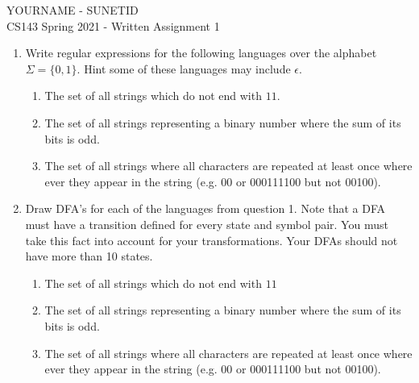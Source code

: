 \documentclass[11pt]{article}
\begin{document}
\begin{center}
\LARGE YOURNAME - SUNETID \\
\LARGE CS143 Spring 2021 - Written Assignment 1 \\
\end{center}

\begin{enumerate}
\item Write regular expressions for the following languages over the alphabet $\Sigma = \{0, 1\}$.  Hint some of these languages may include $\epsilon$.
\begin{enumerate}
    \item The set of all strings which do not end with $11$.
    \[
    \]
    \item The set of all strings representing a binary number where the sum of its bits is odd.
    \[
    \]
    \item The set of all strings where all characters are repeated at least once where ever they appear in the string (e.g. 00 or 000111100 but not 00100).
    \[
    \]
\end{enumerate}

\newpage

\item Draw DFA's for each of the languages from question 1. Note that a DFA must have a transition defined for every state and symbol pair. You must take this fact into account for your transformations. Your DFAs should not have more than 10 states.

\begin{enumerate}
    \item The set of all strings which do not end with $11$ \\
    \item The set of all strings representing a binary number where the sum of its bits is odd. \\
    \item The set of all strings where all characters are repeated at least once where ever they appear in the string (e.g. 00 or 000111100 but not 00100). \\
\end{enumerate}

\newpage


\end{enumerate}
\end{document}
